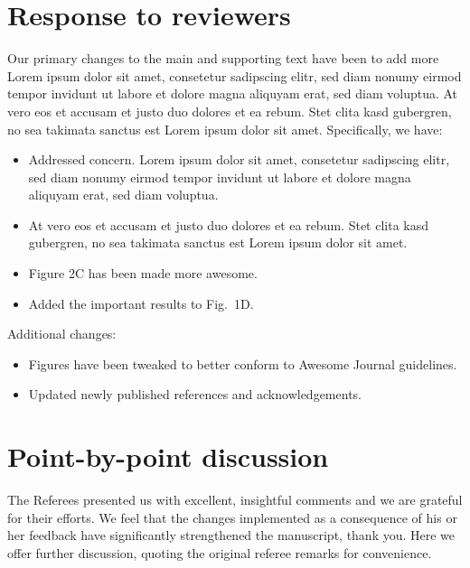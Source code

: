 \documentclass[11pt]{article}
\begin{document}
\section*{Response to reviewers}\label{sec:listofchanges}

Our primary changes to the main and supporting text have been to add more
Lorem ipsum dolor sit amet, consetetur sadipscing elitr, sed diam nonumy
eirmod tempor invidunt ut labore et dolore magna aliquyam erat, sed diam
voluptua. At vero eos et accusam et justo duo dolores et ea rebum. Stet
clita kasd gubergren, no sea takimata sanctus est Lorem ipsum dolor sit
amet.
%
Specifically, we have:
\vspace{-2ex}
\begin{itemize}
    \itemsep=0pt
    \item Addressed concern. Lorem ipsum dolor sit amet, consetetur sadipscing elitr, sed diam nonumy
    eirmod tempor invidunt ut labore et dolore magna aliquyam erat, sed diam
    voluptua. 
    \item At vero eos et accusam et justo duo dolores et ea rebum. Stet
    clita kasd gubergren, no sea takimata sanctus est Lorem ipsum dolor sit
    amet.
    \item Figure 2C has been made more awesome.
    \item Added the important results to Fig.~1D.
\end{itemize}
\vspace{-1.5ex}
Additional changes:
\vspace{-2ex}
\begin{itemize}
    \itemsep=0pt
    \item Figures have been tweaked to better conform to Awesome Journal guidelines.
    \item Updated newly published references and acknowledgements.
\end{itemize}
\vspace{-1.5ex}


\section*{Point-by-point discussion}\label{sec:discussion}

The Referees presented us with excellent, insightful comments and we are grateful
for their efforts. We feel that the changes implemented as a consequence of
his or her feedback have significantly strengthened the manuscript, thank you.
Here we offer further discussion, quoting the original referee remarks for
convenience.
\end{document}
